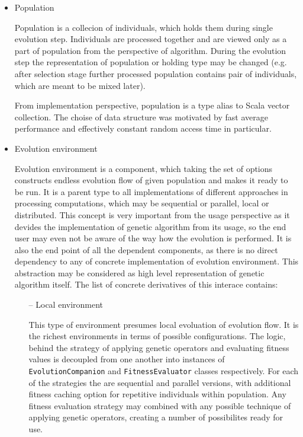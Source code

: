 \begin{itemize}
\item
Population

Population is a collecion of individuals, which holds them during single evolution step. Individuals are processed together and are viewed only as a part of population from the perspective of algorithm. During the evolution step the representation of population or holding type may be changed (e.g. after selection stage further processed population contains pair of individuals, which are meant to be mixed later).

From implementation perspective, population is a type alias to Scala vector collection. The choise of data structure was motivated by fast average performance and effectively constant random access time in particular.
\medbreak

\item
Evolution environment

Evolution environment is a component, which taking the set of options constructs endless evolution flow of given population and makes it ready to be run. It is a parent type to all implementations of different approaches in processing computations, which may be sequential or parallel, local or distributed. This concept is very important from the usage perspective as it devides the implementation of genetic algorithm from its usage, so the end user may even not be aware of the way how the evolution is performed. It is also the end point of all the dependent components, as there is no direct dependency to any of concrete implementation of evolution environment. This abstraction may be considered as high level representation of genetic algorithm itself. The list of concrete derivatives of this interace contains:
\begin{itemize}
\item[--]
Local environment

This type of environment presumes local evoluation of evolution flow. It is the richest environments in terms of possible configurations. The logic, behind the strategy of applying genetic operators and evaluating fitness values is decoupled from one another into instances of \texttt{EvolutionCompanion} and \texttt{FitnessEvaluator} classes respectively. For each of the strategies the are sequential and parallel versions, with additional fitness caching option for repetitive individuals within population. Any fitness evaluation strategy may combined with any possible technique of applying genetic operators, creating a number of possibilites ready for use.
\medbreak


\end{itemize}
\end{itemize}
